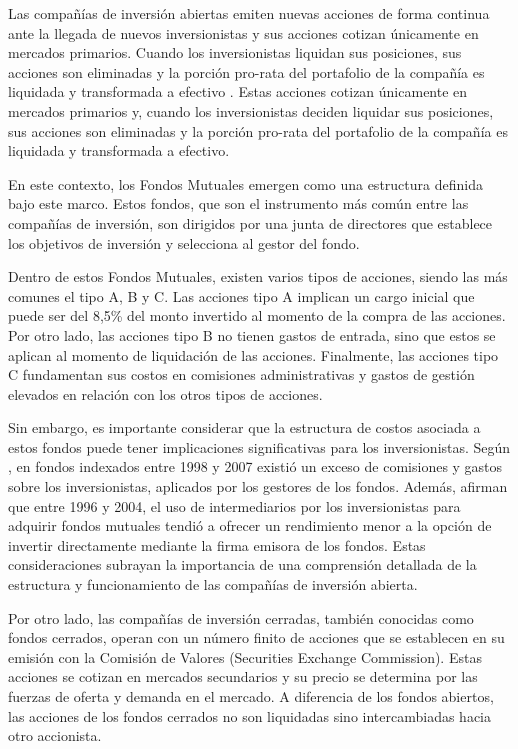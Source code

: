 \documentclass[a4paper,fleqn]{cas-sc}
\begin{document}
Las compañías de inversión abiertas emiten nuevas acciones de forma continua ante la llegada de nuevos inversionistas y sus acciones cotizan únicamente en mercados primarios. Cuando los inversionistas liquidan sus posiciones, sus acciones son eliminadas y la porción pro-rata del portafolio de la compañía es liquidada y transformada a efectivo \cite{Baumol1990}. Estas acciones cotizan únicamente en mercados primarios y, cuando los inversionistas deciden liquidar sus posiciones, sus acciones son eliminadas y la porción pro-rata del portafolio de la compañía es liquidada y transformada a efectivo.

En este contexto, los Fondos Mutuales emergen como una estructura definida bajo este marco. Estos fondos, que son el instrumento más común entre las compañías de inversión, son dirigidos por una junta de directores que establece los objetivos de inversión y selecciona al gestor del fondo.

Dentro de estos Fondos Mutuales, existen varios tipos de acciones, siendo las más comunes el tipo A, B y C. Las acciones tipo A implican un cargo inicial que puede ser del 8,5\% del monto invertido al momento de la compra de las acciones. Por otro lado, las acciones tipo B no tienen gastos de entrada, sino que estos se aplican al momento de liquidación de las acciones. Finalmente, las acciones tipo C fundamentan sus costos en comisiones administrativas y gastos de gestión elevados en relación con los otros tipos de acciones.

Sin embargo, es importante considerar que la estructura de costos asociada a estos fondos puede tener implicaciones significativas para los inversionistas. Según \cite{ADAMS}, en fondos indexados entre 1998 y 2007 existió un exceso de comisiones y gastos sobre los inversionistas, aplicados por los gestores de los fondos. Además, \cite{Bergstresser} afirman que entre 1996 y 2004, el uso de intermediarios por los inversionistas para adquirir fondos mutuales tendió a ofrecer un rendimiento menor a la opción de invertir directamente mediante la firma emisora de los fondos. Estas consideraciones subrayan la importancia de una comprensión detallada de la estructura y funcionamiento de las compañías de inversión abierta.

Por otro lado, las compañías de inversión cerradas, también conocidas como fondos cerrados, operan con un número finito de acciones que se establecen en su emisión con la Comisión de Valores (Securities Exchange Commission). Estas acciones se cotizan en mercados secundarios y su precio se determina por las fuerzas de oferta y demanda en el mercado. A diferencia de los fondos abiertos, las acciones de los fondos cerrados no son liquidadas sino intercambiadas hacia otro accionista.
\end{document}
